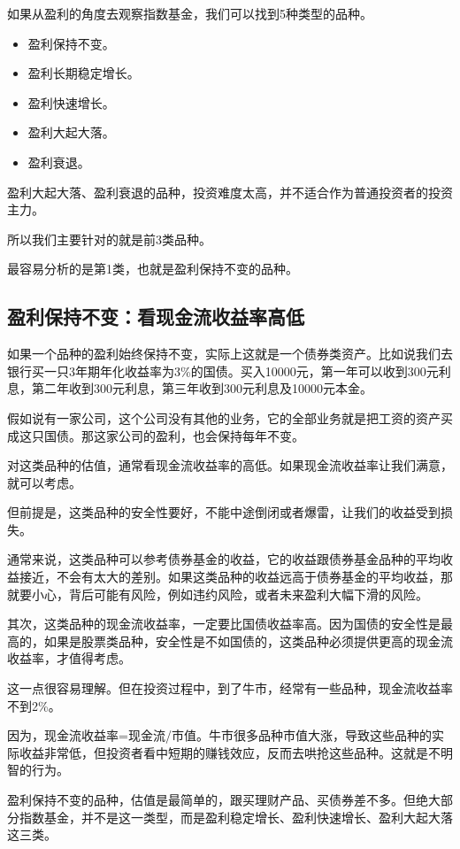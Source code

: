 如果从盈利的角度去观察指数基金，我们可以找到5种类型的品种。

\begin{itemize}
\item 盈利保持不变。
\item 盈利长期稳定增长。
\item 盈利快速增长。
\item 盈利大起大落。
\item 盈利衰退。
\end{itemize}

盈利大起大落、盈利衰退的品种，投资难度太高，并不适合作为普通投资者的投资主力。

所以我们主要针对的就是前3类品种。

最容易分析的是第1类，也就是盈利保持不变的品种。

\subsection{盈利保持不变：看现金流收益率高低}
如果一个品种的盈利始终保持不变，实际上这就是一个债券类资产。比如说我们去银行买一只3年期年化收益率为3\%的国债。买入10000元，第一年可以收到300元利息，第二年收到300元利息，第三年收到300元利息及10000元本金。

假如说有一家公司，这个公司没有其他的业务，它的全部业务就是把工资的资产买成这只国债。那这家公司的盈利，也会保持每年不变。

对这类品种的估值，通常看现金流收益率的高低。如果现金流收益率让我们满意，就可以考虑。

但前提是，这类品种的安全性要好，不能中途倒闭或者爆雷，让我们的收益受到损失。

通常来说，这类品种可以参考债券基金的收益，它的收益跟债券基金品种的平均收益接近，不会有太大的差别。如果这类品种的收益远高于债券基金的平均收益，那就要小心，背后可能有风险，例如违约风险，或者未来盈利大幅下滑的风险。

其次，这类品种的现金流收益率，一定要比国债收益率高。因为国债的安全性是最高的，如果是股票类品种，安全性是不如国债的，这类品种必须提供更高的现金流收益率，才值得考虑。

这一点很容易理解。但在投资过程中，到了牛市，经常有一些品种，现金流收益率不到2\%。

因为，现金流收益率=现金流/市值。牛市很多品种市值大涨，导致这些品种的实际收益非常低，但投资者看中短期的赚钱效应，反而去哄抢这些品种。这就是不明智的行为。

盈利保持不变的品种，估值是最简单的，跟买理财产品、买债券差不多。但绝大部分指数基金，并不是这一类型，而是盈利稳定增长、盈利快速增长、盈利大起大落这三类。

